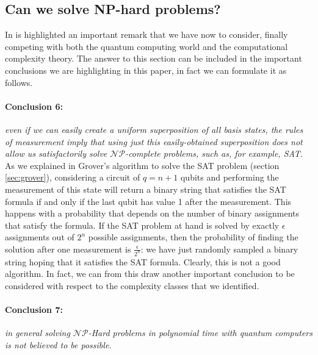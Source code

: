 \documentclass[english]{article}
\begin{document}
		\subsection{Can we solve NP-hard problems?}
		\label{sec:npHardProblems}
			In \cite[G.Nannicini, 2020]{introNoPh} is highlighted an important remark that we have now to consider, finally competing with both the quantum computing world and the computational complexity theory. The answer to this section can be included in the important conclusions we are highlighting in this paper, in fact we can formulate it as follows.
			
			\paragraph{Conclusion 6:} \emph{even if we can easily create a uniform superposition of all basis states, the rules of measurement imply that using just this easily-obtained superposition does not allow us satisfactorily solve $\mathcal{N}\mathcal{P}$-complete problems, such as, for example, SAT.} \\
			
			As we explained in Grover's algorithm to solve the SAT problem (section \ref{sec:grover}), considering a circuit of $q = n + 1$ qubits and performing the measurement of this state will return a binary string that satisfies the SAT formula if and only if the last qubit has value 1 after the measurement. This happens with a probability that depends on the number of binary assignments that satisfy the formula. If the SAT problem at hand is solved by exactly $\epsilon$ assignments out of $2^n$ possible assignments, then the probability of finding the solution after one measurement is $\frac{\epsilon}{2^n}$: we have just randomly sampled a binary string hoping that it satisfies the SAT formula. Clearly, this is not a good algorithm. In fact, we can from this draw another important conclusion to be considered with respect to the complexity classes that we identified.
			
			\paragraph{Conclusion 7:} \emph{in general solving $\mathcal{N}\mathcal{P}$-Hard problems in polynomial time with quantum computers is not believed to be possible.} \\
			
\end{document}
